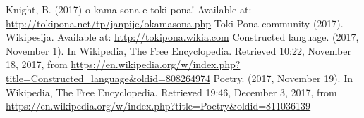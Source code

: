 \documentclass{article}
\begin{document}
\begin{thebibliography}{99}
  Knight, B. (2017) o kama sona e toki pona! Available at:
    \url{http://tokipona.net/tp/janpije/okamasona.php}
  Toki Pona community (2017). Wikipesija. Available at:
    \url{http://tokipona.wikia.com}
  Constructed language. (2017, November 1). In Wikipedia, The Free Encyclopedia. Retrieved 10:22, November 18, 2017, from \url{https://en.wikipedia.org/w/index.php?title=Constructed_language&oldid=808264974}
Poetry. (2017, November 19). In Wikipedia, The Free Encyclopedia.
    Retrieved 19:46, December 3, 2017, from
    \url{https://en.wikipedia.org/w/index.php?title=Poetry&oldid=811036139}
\end{thebibliography}
\end{document}
